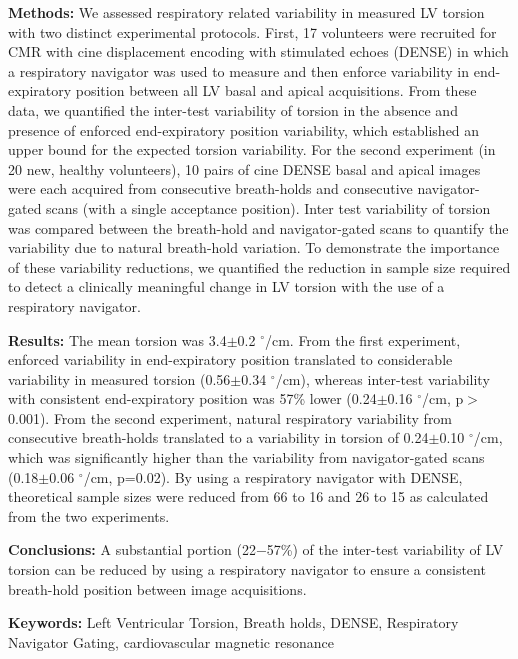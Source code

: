 	\noindent \textbf{Methods:} We assessed respiratory related variability in measured LV torsion with two distinct experimental protocols. First, 17 volunteers were recruited for CMR with cine displacement encoding with stimulated echoes (DENSE) in which a respiratory navigator was used to measure and then enforce variability in end-expiratory position between all LV basal and apical acquisitions. From these data, we quantified the inter-test variability of torsion in the absence and presence of enforced end-expiratory position variability, which established an upper bound for the expected torsion variability. For the second experiment (in 20 new, healthy volunteers), 10 pairs of cine DENSE basal and apical images were each acquired from consecutive breath-holds and consecutive navigator-gated scans (with a single acceptance position). Inter test variability of torsion was compared between the breath-hold and navigator-gated scans to quantify the variability due to natural breath-hold variation. To demonstrate the importance of these variability reductions, we quantified the reduction in sample size required to detect a clinically meaningful change in LV torsion with the use of a respiratory navigator.
	
	\noindent \textbf{Results:} The mean torsion was 3.4$\pm$0.2 $^{\circ}$/cm. From the first experiment, enforced variability in end-expiratory position translated to considerable variability in measured torsion (0.56$\pm$0.34 $^{\circ}$/cm), whereas inter-test variability with consistent end-expiratory position was 57\% lower (0.24$\pm$0.16 $^{\circ}$/cm, p$>$0.001). From the second experiment, natural respiratory variability from consecutive breath-holds translated to a variability in torsion of 0.24$\pm$0.10 $^{\circ}$/cm, which was significantly higher than the variability from navigator-gated scans (0.18$\pm$0.06 $^{\circ}$/cm, p=0.02). By using a respiratory navigator with DENSE, theoretical sample sizes were reduced from 66 to 16 and 26 to 15 as calculated from the two experiments.
	
	\noindent \textbf{Conclusions:} A substantial portion (22$-$57\%) of the inter-test variability of LV torsion can be reduced by using a respiratory navigator to ensure a consistent breath-hold position between image acquisitions.
	
	\noindent \textbf{Keywords:} Left Ventricular Torsion, Breath holds, DENSE, Respiratory Navigator Gating, cardiovascular magnetic resonance\\

